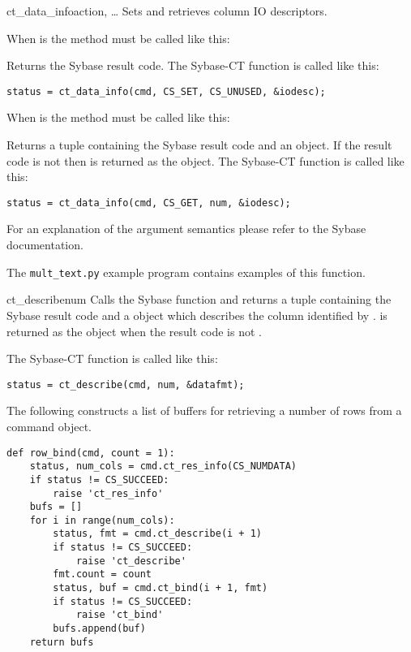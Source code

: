 \begin{methoddesc}[CS_COMMAND]{ct_data_info}{action, \ldots}
Sets and retrieves column IO descriptors.

When  is  the method must be called like
this:


Returns the Sybase result code.  The Sybase-CT
 function is called like this:

\begin{verbatim}
status = ct_data_info(cmd, CS_SET, CS_UNUSED, &iodesc);
\end{verbatim}

When  is  the method must be called like
this:


Returns a tuple containing the Sybase result code and an
 object.  If the result code is not 
then  is returned as the  object.  The
Sybase-CT  function is called like this:

\begin{verbatim}
status = ct_data_info(cmd, CS_GET, num, &iodesc);
\end{verbatim}

For an explanation of the argument semantics please refer to the
Sybase documentation.

The \texttt{mult_text.py} example program contains examples of this
function.
\end{methoddesc}

\begin{methoddesc}[CS_COMMAND]{ct_describe}{num}
Calls the Sybase  function and returns a tuple
containing the Sybase result code and a  object
which describes the column identified by .  is
returned as the  object when the result code is not
.

The Sybase-CT  function is called like this:

\begin{verbatim}
status = ct_describe(cmd, num, &datafmt);
\end{verbatim}

The following constructs a list of buffers for retrieving a number of
rows from a command object.

\begin{verbatim}
def row_bind(cmd, count = 1):
    status, num_cols = cmd.ct_res_info(CS_NUMDATA)
    if status != CS_SUCCEED:
        raise 'ct_res_info'
    bufs = []
    for i in range(num_cols):
        status, fmt = cmd.ct_describe(i + 1)
        if status != CS_SUCCEED:
            raise 'ct_describe'
        fmt.count = count
        status, buf = cmd.ct_bind(i + 1, fmt)
        if status != CS_SUCCEED:
            raise 'ct_bind'
        bufs.append(buf)
    return bufs
\end{verbatim}
\end{methoddesc}

